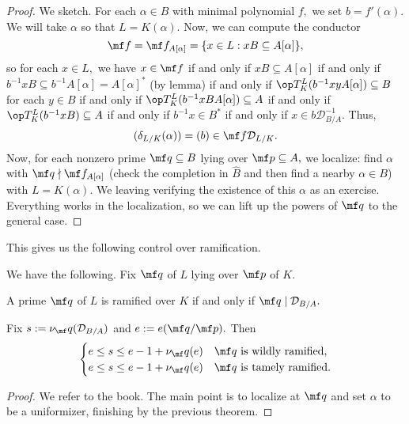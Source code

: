 \begin{proof}
	We sketch. For each $\alpha\in B$ with minimal polynomial $f,$ we set $b=f'(\alpha).$ We will take $\alpha$ so that $L=K(\alpha).$ Now, we can compute the conductor
	\[\mf f=\mf f_{A[\alpha]}=\{x\in L:xB\subseteq A[\alpha]\},\]
	so for each $x\in L,$ we have $x\in\mf f$ if and only if $xB\subseteq A[\alpha]$ if and only if $b^{-1}xB\subseteq b^{-1}A[\alpha]=A[\alpha]^*$ (by lemma) if and only if $\op T^L_K(b^{-1}xyA[\alpha])\subseteq B$ for each $y\in B$ if and only if $\op T^L_K(b^{-1}xBA[\alpha])\subseteq A$ if and only if $\op T^L_K(b^{-1}xB)\subseteq A$ if and only if $b^{-1}x\in B^*$ if and only if $x\in b\mathcal D_{B/A}^{-1}.$ Thus,
	\[(\delta_{L/K}(\alpha))=(b)\in\mf f\mathcal D_{L/K}.\]
	Now, for each nonzero prime $\mf q\subseteq B$ lying over $\mf p\subseteq A,$ we localize: find $\alpha$ with $\mf q\nmid\mf f_{A[\alpha]}$ (check the completion in $\hat B$ and then find a nearby $\alpha\in B$) with $L=K(\alpha).$ We leaving verifying the existence of this $\alpha$ as an exercise. Everything works in the localization, so we can lift up the powers of $\mf q$ to the general case.\todo{}
\end{proof}

This gives us the following control over ramification.
\begin{theorem}
	We have the following. Fix $\mf q$ of $L$ lying over $\mf p$ of $K.$
	\begin{listalph}
		\item A prime $\mf q$ of $L$ is ramified over $K$ if and only if $\mf q\mid\mathcal D_{B/A}.$
		\item Fix $s:=\nu_\mf q(\mathcal D_{B/A})$ and $e:=e(\mf q/\mf p).$ Then
		\[\begin{cases}
			e\le s\le e-1+\nu_\mf q(e) & \mf q\text{ is wildly ramified}, \\
			e\le s\le e-1+\nu_\mf q(e) & \mf q\text{ is tamely ramified}.
		\end{cases}\]
	\end{listalph}
\end{theorem}
\begin{proof}
	We refer to the book. The main point is to localize at $\mf q$ and set $\alpha$ to be a uniformizer, finishing by the previous theorem.
\end{proof}

